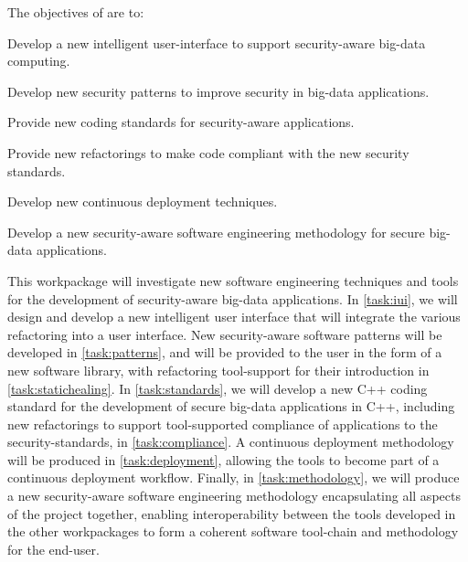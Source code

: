 \addtocounter{wpno}{1}
\begin{Workpackage}{\thewpno}
\WPTitle{\wpname{\thewpno}}



\begin{WPObjectives}
The objectives of \theWP{} are to:
\begin{compactitem}
\item Develop a new intelligent user-interface to support security-aware big-data computing.
\item Develop new security patterns to improve security in big-data applications.
\item Provide new coding standards for security-aware applications.
\item Provide new refactorings to make code compliant with the new security standards.
\item Develop new continuous deployment techniques.
\item Develop a new security-aware software engineering methodology for secure big-data applications.

\end{compactitem}
\end{WPObjectives}

\begin{WPDescription}
This workpackage will investigate new software engineering techniques and tools for the development of security-aware big-data applications. In \ref{task:iui}, we will design and develop a new intelligent user interface that will integrate the various refactoring into a user interface. New security-aware software patterns will be developed in \ref{task:patterns}, and will be provided to the user in the form of a new software library, with refactoring tool-support for their introduction in \ref{task:statichealing}.  In \ref{task:standards}, we will develop a new C++ coding standard for the development of secure big-data applications in C++, including new refactorings to support tool-supported compliance of applications to the security-standards, in \ref{task:compliance}. A continuous deployment methodology will be produced in \ref{task:deployment}, allowing the \TheProject{} tools to become part of a continuous deployment workflow.
Finally, in \ref{task:methodology}, we will produce a new security-aware software engineering methodology encapsulating all aspects of the \TheProject{} project together, enabling interoperability between the tools developed in the other workpackages to form a coherent software tool-chain and methodology for the end-user. 



\end{WPDescription}
\end{Workpackage}
